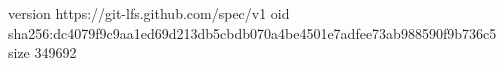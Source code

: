 version https://git-lfs.github.com/spec/v1
oid sha256:dc4079f9c9aa1ed69d213db5cbdb070a4be4501e7adfee73ab988590f9b736c5
size 349692
